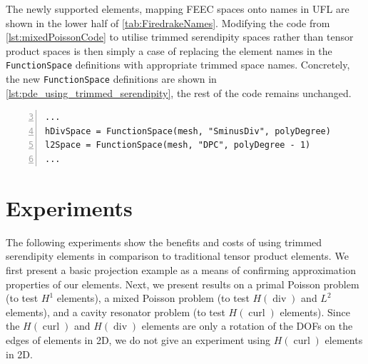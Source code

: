 \documentclass[format=acmsmall,screen,timestamp=false,a4paper]{acmart}
\DeclareMathOperator{\Div}{div}
\DeclareMathOperator{\curl}{curl}
\newcommand\josh[1]{\textbf{\textcolor[rgb]{0,.5,1}{[Josh: #1]}}}
\newcommand\lm[1]{\textbf{\textcolor[rgb]{1,0,0.5}{[Lawrence: #1]}}}
\newcommand{\hcurl}{\ensuremath{{H}(\curl)}\xspace}
\newcommand{\hdiv}{\ensuremath{{H}(\Div)}\xspace}
\begin{document}
The newly supported elements, mapping FEEC spaces onto names in UFL are shown in the lower half of \cref{tab:FiredrakeNames}. Modifying the code from \cref{lst:mixedPoissonCode} to utilise trimmed serendipity spaces rather than tensor product spaces is then simply a case of replacing the element names in the \texttt{FunctionSpace} definitions with appropriate trimmed space names. Concretely, the new \texttt{FunctionSpace} definitions are shown in \cref{lst:pde_using_trimmed_serendipity}, the rest of the code remains unchanged.
\begin{lstlisting}[float=htbp,caption={Setting up Firedrake to use the trimmed serendipity elements in a mixed Poisson problem in 3D.}, label={lst:pde_using_trimmed_serendipity}, numbers=left, firstnumber=3, xleftmargin=20pt,  xrightmargin=20pt]
...
hDivSpace = FunctionSpace(mesh, "SminusDiv", polyDegree)
l2Space = FunctionSpace(mesh, "DPC", polyDegree - 1)
...
\end{lstlisting}





  \section{Experiments}
    
The following experiments show the benefits and costs of using trimmed serendipity elements in comparison to traditional tensor product elements.  We first present a basic projection example as a means of confirming approximation properties of our elements.  Next, we present results on a primal Poisson problem (to test $H^1$ elements), a mixed Poisson problem (to test \hdiv and $L^2$ elements), and a cavity resonator problem (to test \hcurl elements).  Since the \hcurl and \hdiv elements are only a rotation of the DOFs on the edges of elements in 2D, we do not give an experiment using \hcurl elements in 2D. 
\end{document}
